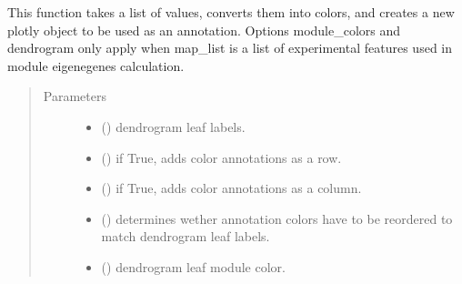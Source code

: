 \documentclass[letterpaper,10pt,english]{sphinxmanual}
\begin{document}
\begin{fulllineitems}
\label{\detokenize{_autosummary/analytics_core.viz:analytics_core.viz.wgcnaFigures.get_module_color_annotation}}
This function takes a list of values, converts them into colors, and creates a new plotly object to be used as an annotation.
Options module\_colors and dendrogram only apply when map\_list is a list of experimental features used in module eigenegenes calculation.
\begin{quote}\begin{description}
\item[{Parameters}] \leavevmode\begin{itemize}
\item {} 
 () \textendash{} dendrogram leaf labels.

\item {} 
 () \textendash{} if True, adds color annotations as a row.

\item {} 
 () \textendash{} if True, adds color annotations as a column.

\item {} 
 () \textendash{} determines wether annotation colors have to be reordered to match dendrogram leaf labels.

\item {} 
 () \textendash{} dendrogram leaf module color.


\end{itemize}
\end{description}
\end{quote}
\end{fulllineitems}
\end{document}
